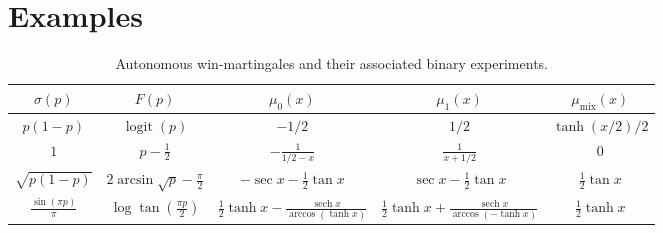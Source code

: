 \documentclass[11pt, reqno]{amsart}
\theoremstyle{plain}
\theoremstyle{remark}
\newcommand{\logit}{\operatorname{logit}}
\numberwithin{equation}{section}
\begin{document}
%
%
%
%


%


%
%
%
%
%
%

%
%
%
%
%


%

%
%
%
%
%
%
%
%
%

%
%
%



\section{Examples}\label{sec:examples}


\begin{table}[t]
    \centering
    \caption{Autonomous win-martingales and their associated binary experiments.}
    \label{tab:examples}
    \footnotesize
    \renewcommand{\arraystretch}{1.5}
    \setlength{\tabcolsep}{3.5pt}
    \begin{tabular}{@{}ccccc@{}}
        \hline
        $\sigma(p)$
        &
        $F(p)$
        &
        $\mu_0(x)$
        &
        $\mu_1(x)$
        &
        $\mu_{\mathrm{mix}}(x)$
        \\
        \hline

        $\displaystyle p(1-p)$
        &
        $\displaystyle \logit(p)$%
        &
        $\displaystyle -1/2$
        &
        $\displaystyle 1/2$
        &
        $\displaystyle \tanh\left(x/2\right)/2$
        \\[1.5ex]

        $\displaystyle 1$
        &
        $\displaystyle p-\frac12$
        &
        $\displaystyle -\frac{1}{1/2-x}$
        &
        $\displaystyle \frac{1}{x+1/2}$
        &
        $\displaystyle 0$
        \\[2ex]

        $\displaystyle \sqrt{p(1-p)}$
        &
        $\displaystyle 2\arcsin\sqrt p-\frac{\pi}{2}$
        &
        $\displaystyle -\sec x-\frac12\tan x$
        &
        $\displaystyle \sec x-\frac12\tan x$
        &
        $\displaystyle \frac12\tan x$
        \\[2ex]

        $\displaystyle \frac{\sin(\pi p)}{\pi}$
        &
        $\displaystyle \log\tan\left(\frac{\pi p}{2}\right)$
        &
        $\displaystyle
        \frac12\tanh x
        -\frac{\operatorname{sech}x}{\arccos(\tanh x)}$
        &
        $\displaystyle
        \frac12\tanh x
        +\frac{\operatorname{sech}x}{\arccos(-\tanh x)}$
        &
        $\displaystyle \frac12\tanh x$
        \\[2.5ex]


\end{tabular}
\end{table}
\end{document}
